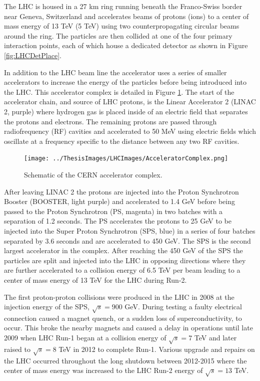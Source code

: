 The LHC is housed in a 27 km ring running beneath the Franco-Swiss border near Geneva, Switzerland and accelerates beams of protons (ions) to a center of mass energy of 13 TeV (5 TeV) using two counterpropagating circular beams around the ring.  The particles are then collided at one of the four primary interaction points, each of which house a dedicated detector as shown in Figure \ref{fig:LHCDetPlace}. 

In addition to the LHC beam line the accelerator uses a series of smaller accelerators to increase the energy of the particles before being introduced into the LHC.  This accelerator complex is detailed in Figure \ref{fig:AcceleratorMap}.  The start of the accelerator chain, and source of LHC protons, is the Linear Accelerator 2 (LINAC 2, purple) where hydrogen gas is placed inside of an electric field that separates the protons and electrons.  The remaining protons are passed through radiofrequency (RF) cavities and accelerated to 50 MeV using electric fields which oscillate at a frequency specific to the distance between any two RF cavities.
\begin{figure}[h!]
	\centering
	\texttt{[image: ../ThesisImages/LHCImages/AcceleratorComplex.png]}
	\caption[Schematic of the CERN accelerator complex.]{Schematic of the CERN accelerator complex.\cite{LHCAccComplex}
	}
	\label{fig:AcceleratorMap}
\end{figure}

After leaving LINAC 2 the protons are injected into the Proton Synchrotron Booster (BOOSTER, light purple) and accelerated to 1.4 GeV before being passed to the Proton Synchrotron (PS, magenta) in two batches with a separation of 1.2 seconds.  The PS accelerates the protons to 25 GeV to be injected into the Super Proton Synchrotron (SPS, blue) in a series of four batches separated by 3.6 seconds and are accelerated to 450 GeV.  The SPS is the second largest accelerator in the complex.  After reaching the 450 GeV of the SPS the particles are split and injected into the LHC in opposing directions where they are further accelerated to a collision energy of 6.5 TeV per beam leading to a center of mass energy of 13 TeV for the LHC during Run-2.

The first proton-proton collisions were produced in the LHC in 2008 at the injection energy of the SPS, $\sqrt{s} =900$ GeV.  During testing a faulty electrical connection caused a magnet quench, or a sudden loss of superconductivity, to occur.  This broke the nearby magnets and caused a delay in operations until late 2009 when LHC Run-1 began at a collision energy of $\sqrt{s} = 7$ TeV and later raised to $\sqrt{s}=8$ TeV in 2012 to complete Run-1.  Various upgrade and repairs on the LHC occurred throughout the long shutdown between 2012-2015 where the center of mass energy was increased to the LHC Run-2 energy of $\sqrt{s} = 13$ TeV.

